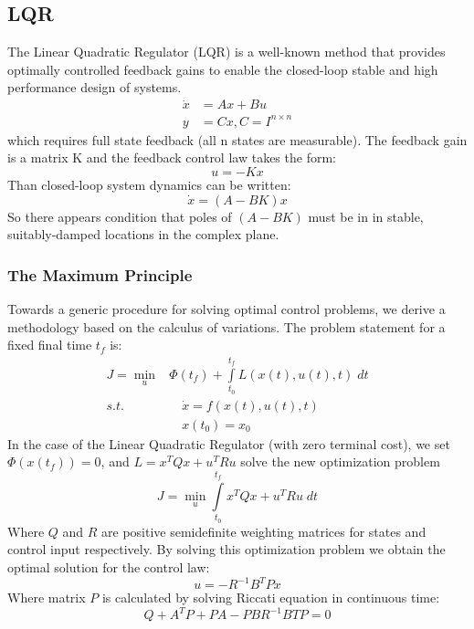 \subsection{LQR}
The Linear Quadratic Regulator (LQR) is a well-known method that provides optimally controlled feedback gains to enable the closed-loop stable and high performance design of systems.
\begin{equation}
\begin{split}
\dot{x} &= Ax + Bu\\
y &= Cx, C=I^{n \times n}
\end{split}
\end{equation}
which requires  full state feedback (all n states are measurable).
The feedback gain is a matrix K and the feedback control law takes the form:
\begin{equation}
	u = -Kx
\end{equation}
Than closed-loop system dynamics can be written:
\begin{equation}
\dot{x} = (A-BK)x
\end{equation}
So there appears condition that poles of $(A-BK)$ must be in in stable, suitably-damped locations in the complex plane.
\subsubsection{The Maximum Principle}
Towards a generic procedure for solving optimal control problems, we derive a methodology based on the calculus of variations. The problem statement for a fixed final time $t_f$ is:
\begin{equation}
\begin{split}
	J = \min_{u}& \Phi(t_f)+\int\limits_{t_0}^{t_f}L(x(t),u(t),t)\;dt\\
	s.t.&\quad  \dot{x} = f(x(t),u(t),t)\\
	& \quad x(t_0) = x_0
	\end{split}
\end{equation}
In the case of the Linear Quadratic Regulator (with zero terminal cost), we set  $\Phi(x(t_f))=0$, and $L = x^TQx+u^TRu$ solve the new optimization problem
\begin{equation}
J=\min_{u}  \int\limits_{t_0}^{t_f}x^TQx+u^TRu\;dt
\end{equation}
Where $Q$ and $R$ are positive semidefinite weighting matrices for states and control input respectively. By solving this optimization problem we obtain the optimal solution for the control law:
\begin{equation}
u = -R^{-1}B^TPx
\end{equation}
Where matrix $P$ is calculated by solving Riccati equation in continuous time:
\begin{equation}
Q + A^TP + PA - PBR^{-1}BTP = 0
\end{equation}
